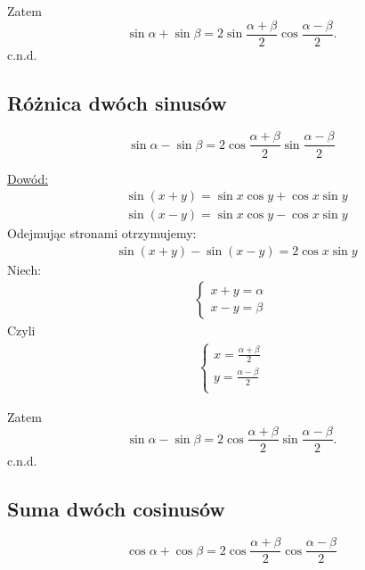 \documentclass[12pt,a4paper,fleqn]{article}
\begin{document}
		Zatem
		\begin{equation*}
			\sin\alpha + \sin \beta =2\sin\frac{\alpha+\beta}{2}\cos\frac{\alpha-\beta}{2}.
		\end{equation*}
	c.n.d.

	\subsection{Różnica dwóch sinusów}
		\begin{equation*}
			\sin\alpha - \sin \beta =2\cos\frac{\alpha+\beta}{2}\sin\frac{\alpha-\beta}{2} 
		\end{equation*}
		
		\underline{Dowód:} \noindent
		\begin{align*}
			&\sin(x+y) = \sin x \cos y + \cos x \sin y\\
			&\sin(x-y) = \sin x \cos y - \cos x \sin y
		\end{align*}
			Odejmując stronami otrzymujemy:
		\begin{align*}
			&\sin(x+y) - \sin(x-y) = 2\cos x \sin y
		\end{align*}
		Niech:
		\begin{align*}
		\begin{cases}
			x+y = \alpha\\
			x-y = \beta
		\end{cases}
		\end{align*}
		Czyli
		\begin{align*}
		\begin{cases}
		 	x = \frac{\alpha+\beta}{2}\\
		 	y = \frac{\alpha-\beta}{2}\\
		\end{cases}
		\end{align*}
		
		Zatem
		\begin{equation*}
			\sin\alpha - \sin \beta =2\cos\frac{\alpha+\beta}{2}\sin\frac{\alpha-\beta}{2}.
		\end{equation*}
	c.n.d.
			
\newpage

	\subsection{Suma dwóch cosinusów}
		\begin{equation*}
			\cos\alpha + \cos \beta =2\cos\frac{\alpha+\beta}{2}\cos\frac{\alpha-\beta}{2} 
		\end{equation*}
		
\end{document}
